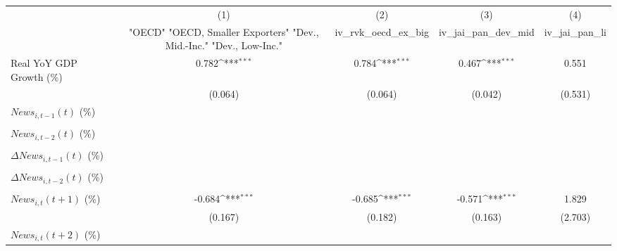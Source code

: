 {
\def\sym#1{\ifmmode^{#1}\else\(^{#1}\)\fi}
\begin{tabular}{l*{4}{c}}
\toprule
                    &\multicolumn{1}{c}{(1)}&\multicolumn{1}{c}{(2)}&\multicolumn{1}{c}{(3)}&\multicolumn{1}{c}{(4)}\\
                    &\multicolumn{1}{c}{ "OECD" "OECD, Smaller Exporters" "Dev., Mid.-Inc." "Dev., Low-Inc."}&\multicolumn{1}{c}{iv_rvk_oecd_ex_big}&\multicolumn{1}{c}{iv_jai_pan_dev_mid}&\multicolumn{1}{c}{iv_jai_pan_li}\\
\midrule
Real YoY GDP Growth (\%)&       0.782\sym{***}&       0.784\sym{***}&       0.467\sym{***}&       0.551         \\
                    &     (0.064)         &     (0.064)         &     (0.042)         &     (0.531)         \\
\addlinespace
$ News_{i,t-1}(t)$ (\%)&                     &                     &                     &                     \\
                    &                     &                     &                     &                     \\
\addlinespace
$ News_{i,t-2}(t)$ (\%)&                     &                     &                     &                     \\
                    &                     &                     &                     &                     \\
\addlinespace
$ \Delta News_{i,t-1}(t)$ (\%)&                     &                     &                     &                     \\
                    &                     &                     &                     &                     \\
\addlinespace
$ \Delta News_{i,t-2}(t)$ (\%)&                     &                     &                     &                     \\
                    &                     &                     &                     &                     \\
\addlinespace
$ News_{i,t}(t+1)$ (\%)&      -0.684\sym{***}&      -0.685\sym{***}&      -0.571\sym{***}&       1.829         \\
                    &     (0.167)         &     (0.182)         &     (0.163)         &     (2.703)         \\
\addlinespace
$ News_{i,t}(t+2)$ (\%)&                     &                     &                     &                     \\

\end{tabular}}
